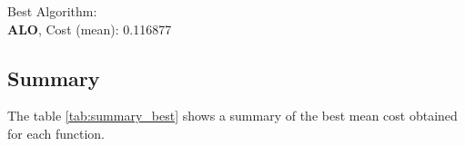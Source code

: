 \documentclass[12pt]{article}
\begin{document}
Best Algorithm: \\
\textbf{ALO}, Cost (mean): 0.116877\\

















    \subsection{Summary}
    

The table \ref{tab:summary_best} shows a summary of the best mean cost obtained for each function.




\end{document}
